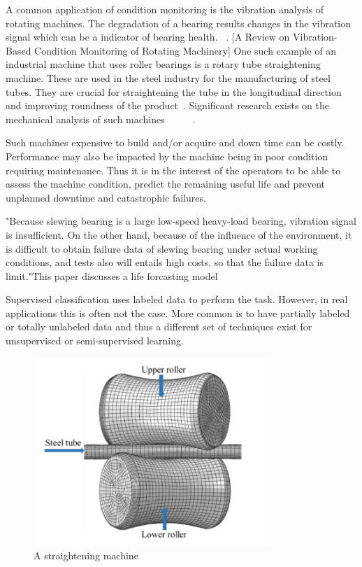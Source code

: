 \documentclass{article}
\begin{document}
A common application of condition monitoring is the vibration analysis of rotating machines. The degradation of a bearing results changes in the vibration signal which can be a indicator of bearing health. ~\cite{soualhi2021novel}.
[A Review on Vibration-Based Condition Monitoring of Rotating Machinery]
One such example of an industrial machine that uses roller bearings is a rotary tube straightening machine. These are used in the steel industry for the manufacturing of steel tubes. They are crucial for straightening the tube in the longitudinal direction and improving roundness of the product~\cite{yoshimura2009effect}. Significant research exists on the mechanical analysis of such machines ~\cite{kato2014straightening}~\cite{ma2020effect}~\cite{ma2021analysis}~\cite{yu2018theoretical}~\cite{das1991mechanics}. 

Such machines expensive to build and/or acquire and down time can be costly. Performance may also be impacted by the machine being in poor condition requiring maintenance. Thus it is in the interest of the operators to be able to assess the machine condition, predict the remaining useful life and prevent unplanned downtime and catastrophic failures.

"Because slewing bearing is a large low-speed heavy-load bearing, vibration signal is insufficient. On the other hand, because of the influence of the
environment, it is difficult to obtain failure data of slewing bearing under actual working conditions, and tests also will entails high costs, so that the failure data is limit."This paper discusses a life forcasting model~\cite{wang2016multiple}

Supervised classification uses labeled data to perform the task. However, in real applications this is often not the case. More common is to have partially labeled or totally unlabeled data and thus a different set of techniques exist for unsupervised or semi-supervised learning.

\begin{figure}[H]
	\centering
	\includegraphics[width=90mm, keepaspectratio]{straightening2.png}
	\caption{A straightening machine~\cite{ma2020effect}}
	\label{straighteningImage2}
\end{figure}
\end{document}
